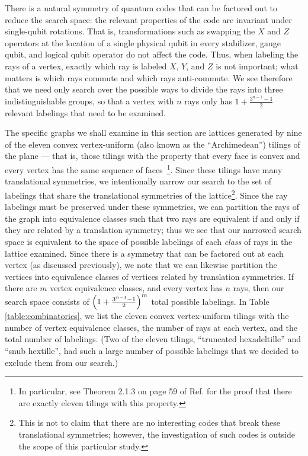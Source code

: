 \documentclass[twocolumn,showpacs,preprintnumbers,amsmath,amssymb,nofootinbib,pra,floatfix]{revtex4-1}
\begin{document}
There is a natural symmetry of quantum codes that can be factored out to reduce the search space:  the relevant properties of the code are invariant under single-qubit rotations.  That is, transformations such as swapping the $X$ and $Z$ operators at the location of a single physical qubit in every stabilizer, gauge qubit, and logical qubit operator do not affect the code.  Thus, when labeling the rays of a vertex, exactly which ray is labeled $X$, $Y$, and $Z$ is not important;  what matters is which rays commute and which rays anti-commute.  We see therefore that we need only search over the possible ways to divide the rays into three indistinguishable groups, so that a vertex with $n$ rays only has $1+\frac{3^{n-1}-1}{2}$ relevant labelings that need to be examined.

The specific graphs we shall examine in this section are lattices generated by nine of the eleven convex vertex-uniform (also known as the ``Archimedean'') tilings of the plane --- that is, those tilings with the property that every face is convex and every vertex has the same sequence of faces~\cite{Gruenbaum1987}\footnote{In particular, see Theorem 2.1.3 on page 59 of Ref. \cite{Gruenbaum1987} for the proof that there are exactly eleven tilings with this property.}.  Since these tilings have many translational symmetries, we intentionally narrow our search to the set of labelings that share the translational symmetries of the lattice\footnote{This is not to claim that there are no interesting codes that break these translational symmetries;  however, the investigation of such codes is outside the scope of this particular study.}.  Since the ray labelings must be preserved under these symmetries, we can partition the rays of the graph into equivalence classes such that two rays are equivalent if and only if they are related by a translation symmetry;  thus we see that our narrowed search space is equivalent to the space of possible labelings of each \emph{class} of rays in the lattice examined.  Since there is a symmetry that can be factored out at each vertex (as discussed previously), we note that we can likewise partition the vertices into equivalence classes of vertices related by translation symmetries.  If there are $m$ vertex equivalence classes, and every vertex has $n$ rays, then our search space consists of $\left(1+\frac{3^{n-1}-1}{2}\right)^m$ total possible labelings.  In Table \ref{table:combinatorics}, we list the eleven convex vertex-uniform tilings with the number of vertex equivalence classes, the number of rays at each vertex, and the total number of labelings.  (Two of the eleven tilings, ``truncated hexadeltille'' and ``snub hextille'', had such a large number of possible labelings that we decided to exclude them from our search.)
\end{document}
